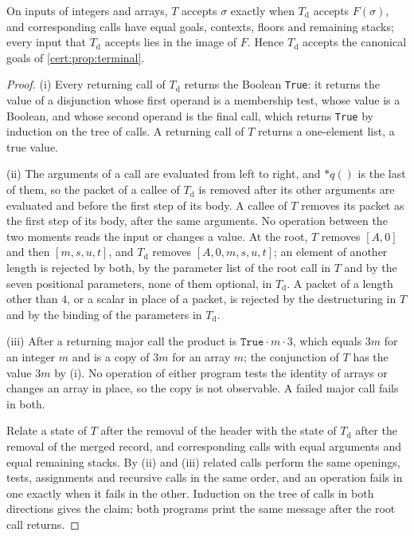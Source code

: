 \begin{proposition}\label{cert:prop:direct-packets}
On inputs of integers and arrays, $T$ accepts $\sigma$ exactly when
$T_{\mathrm d}$ accepts $F(\sigma)$, and corresponding calls have equal goals,
contexts, floors and remaining stacks; every input that $T_{\mathrm d}$ accepts
lies in the image of $F$. Hence $T_{\mathrm d}$ accepts the canonical goals of
\cref{cert:prop:terminal}.
\end{proposition}
\begin{proof}
(i) Every returning call of $T_{\mathrm d}$ returns the Boolean \texttt{True}: it
returns the value of a disjunction whose first operand is a membership test,
whose value is a Boolean, and whose second operand is the final call, which
returns \texttt{True} by induction on the tree of calls. A returning call of $T$
returns a one-element list, a true value.

(ii) The arguments of a call are evaluated from left to right, and ${*}q()$ is
the last of them, so the packet of a callee of $T_{\mathrm d}$ is removed after
its other arguments are evaluated and before the first step of its body. A
callee of $T$ removes its packet as the first step of its body, after the same
arguments. No operation between the two moments reads the input or changes a
value. At the root, $T$ removes $[A,0]$ and then $[m,s,u,t]$, and $T_{\mathrm d}$
removes $[A,0,m,s,u,t]$; an element of another length is rejected by both, by
the parameter list of the root call in $T$ and by the seven positional
parameters, none of them optional, in $T_{\mathrm d}$. A packet of a length other
than $4$, or a scalar in place of a packet, is rejected by the destructuring in
$T$ and by the binding of the parameters in $T_{\mathrm d}$.

(iii) After a returning major call the product is $\mathtt{True}\cdot m\cdot 3$,
which equals $3m$ for an integer $m$ and is a copy of $3m$ for an array $m$; the
conjunction of $T$ has the value $3m$ by (i). No operation of either program
tests the identity of arrays or changes an array in place, so the copy is not
observable. A failed major call fails in both.

Relate a state of $T$ after the removal of the header with the state of
$T_{\mathrm d}$ after the removal of the merged record, and corresponding calls
with equal arguments and equal remaining stacks. By (ii) and (iii) related calls
perform the same openings, tests, assignments and recursive calls in the same
order, and an operation fails in one exactly when it fails in the other.
Induction on the tree of calls in both directions gives the claim; both
programs print the same message after the root call returns.
\end{proof}

